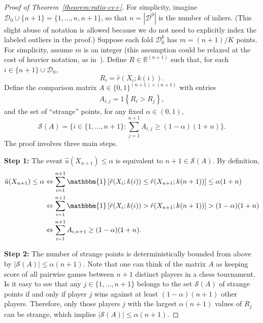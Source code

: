\documentclass[11pt]{article}
\begin{document}
\begin{proof}[Proof of Theorem~\ref{theorem:ratio-cv+}]
For simplicity, imagine $\mathcal{D}_0 \cup \{n+1\} = \{1,\ldots,n,n+1\}$, so that $n=|\mathcal{D}^0|$ is the number of inliers. (This slight abuse of notation is allowed because we do not need to explicitly index the labeled outliers in the proof.)
Suppose each fold $\mathcal{D}_0^k$ has $m=(n+1)/K$ points.
For simplicity, assume $m$ is an integer (this assumption could be relaxed at the cost of heavier notation, as in~\cite{barber2019predictive}).
Define $R \in \mathbb{R}^{(n+1)}$ such that, for each $i \in \{n+1\} \cup \mathcal{D}_0$,
\begin{equation*}
    R_{i}=\hat{r}(X_{i}; k(i)).
\end{equation*}
Define the comparison matrix $A \in \{0,1\}^{(n+1)\times(n+1)}$ with entries
\begin{align*}
    A_{i,j} = 1\left\{ R_{i} > R_{j}\right\},
\end{align*}
and the set of ``strange'' points, for any fixed $\alpha \in (0,1)$,
\begin{equation*}
    \mathcal{S}(A)=\bigg\{i \in \{1, \dots, n+1\}: \sum_{j=1}^{n+1}A_{i,j} \geq (1-\alpha)(1+n) \bigg\}.
\end{equation*}
The proof involves three main steps.

\textbf{Step 1:} The event $\hat{u}(X_{n+1}) \leq \alpha$ is equivalent to $n+1 \in \mathcal{S}(A)$. By definition,
\begin{align*}
    \hat{u}(X_{n+1}) \leq \alpha & \Leftrightarrow
    \sum_{i=1}^{n+1}  \mathbbm{1}\left[ \hat{r}(X_{i}; k(i)) \leq \hat{r}(X_{n+1}; k(n+1)) \right] \leq \alpha (1+n)\\
    & \Leftrightarrow
    \sum_{i=1}^{n+1}  \mathbbm{1}\left[ \hat{r}(X_{i}; k(i)) > \hat{r}(X_{n+1}; k(n+1)) \right] > (1-\alpha) (1+n)\\
    & \Leftrightarrow
    \sum_{i=1}^{n+1}  A_{i,n+1} \geq (1-\alpha) (1+n).
\end{align*}

\textbf{Step 2:} The number of strange points is deterministically bounded from above by $|\mathcal{S}(A)| \leq \alpha (n+1)$.
Note that one can think of the matrix $A$ as keeping score of all pairwise games between $n+1$ distinct players in a chess tournament.
Is it easy to see that any $j \in \{1,\ldots,n+1\}$ belongs to the set $\mathcal{S}(A)$ of strange points if and only if player $j$ wins against at least $(1-\alpha)(n+1)$ other players. Therefore, only those players $j$ with the largest $\alpha(n+1)$ values of $R_j$ can be strange, which implies $|\mathcal{S}(A)| \leq \alpha (n+1)$.


\end{proof}
\end{document}
